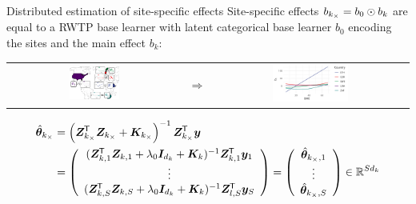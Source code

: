 \documentclass[t,10pt]{beamer}
\newcommand{\penMat}{\bm{K}}
\newcommand{\idMat}{\bm{I}}
\begin{document}
\begin{frame}{Distributed estimation of site-specific effects}
  Site-specific effects $b_{k_\times} = b_0 \odot b_k$ are equal to a RWTP base learner with latent categorical base learner $b_0$ encoding the sites and the main effect $b_k$:
  \begin{center}
  \begin{tabular}{ccc}
    \includegraphics[align=c,width=0.3\textwidth]{figures/fig-site-effects.png} &
    {\Large $\Rightarrow$} &
    \includegraphics[align=c,width=0.4\textwidth]{figures/bs-tensor/fig-cat-num.png} \\
  \end{tabular}
  \end{center}
  \begin{align*}
    \tbh_{\lsite}%
    &= \left(\design_{\lsite}^\tran \design_{\lsite} +  \penMat_{\lsite}\right)^{-1}\design_{\lsite}^\tran \yv
    \notag \\
    &= \left(\begin{array}{c}
         (\design_{\blk,1}^\tran \design_{\blk,1} + \lambda_0\idMat_{d_\blk} + \penMat_\blk)^{-1} \design_{\blk,1}^\tran \yv_1 \\
         \vdots \\
         (\design_{\blk,\nSites}^\tran \design_{\blk,\nSites} + \lambda_0\idMat_{d_\blk} + \penMat_\blk)^{-1} \design_{l,\nSites}^\tran \yv_\nSites
    \end{array}\right) =
    \left(\begin{array}{c}
      \tbh_{{\lsite}, 1}  \\
      \vdots \\
      \tbh_{{\lsite}, \nSites}
    \end{array}\right)\in\R^{Sd_k}
  \end{align*}

\end{frame}
\end{document}
